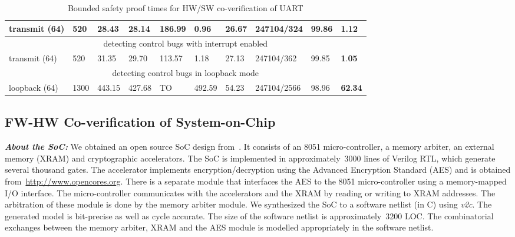 \documentclass[sigconf]{acmart}
\begin{document}
\begin{table}
\begin{center}
{\begin{scriptsize}
\begin{tabular}{|l|l|l|l|l|l|l|l|l|l|}
transmit (64) & 520 & 28.43 & 28.14 & 186.99 & \textbf{0}.\textbf{96} & 26.67 &
247104/324 & 99.86 & 1.12 \\ \hline
\multicolumn{10}{|c|}{detecting control bugs with interrupt enabled} \\ \hline
transmit (64) & 520 & 31.35 & 29.70 & 113.57 & 1.18 & 27.13 & 247104/362 & 99.85 & \textbf{1}.\textbf{05} \\ \hline
\multicolumn{10}{|c|}{detecting control bugs in loopback mode} \\ \hline
loopback (64) & 1300 & 443.15 & 427.68 & TO & 492.59 & 54.23 & 247104/2566 &
98.96 & \textbf{62}.\textbf{34} \\ \hline
\end{tabular}
\end{scriptsize}
}
\end{center}
\vspace{-1.3mm}
\caption{Bounded safety proof times for HW/SW co-verification of UART 
\label{table:safe}}
\end{table}

\subsection{FW-HW Co-verification of System-on-Chip}

\textbf{\emph{About the SoC:}}
%
We obtained an open source SoC design
from~\cite{DBLP:conf/fmcad/SubramanyanVRM15}.  It consists of an 8051
micro-controller, a memory arbiter, an external memory (XRAM) and
cryptographic accelerators.  The SoC is implemented in approximately~3000
lines of Verilog RTL, which generate several thousand gates.  The
accelerator implements encryption/decryption using the Advanced Encryption
Standard (AES) and is obtained
from~\href{http://www.opencores.org}{http://www.opencores.org}.  There is a
separate module that interfaces the AES to the 8051 micro-controller using a
memory-mapped I/O interface.  The micro-con\-tro\-ller communicates with the
accelerators and the XRAM by reading or writing to XRAM addresses.  The
arbitration of these module is done by the memory arbiter module.  We
synthesized the SoC to a software netlist (in C) using {\em v2c}.  The
generated model is bit-precise as well as cycle accurate.  The size of the
software netlist is approximately~3200 LOC.  The combinatorial exchanges
between the memory arbiter, XRAM and the AES module is modelled
appropriately in the software netlist.  \\
\end{document}
